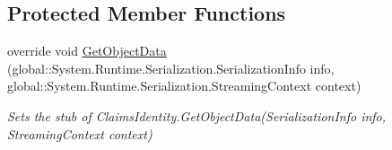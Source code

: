 \subsection*{Protected Member Functions}
\begin{DoxyCompactItemize}
\item 
override void \hyperlink{class_system_1_1_security_1_1_principal_1_1_fakes_1_1_stub_generic_identity_a4d63decef27cbae35b1bbe529596cc87}{Get\-Object\-Data} (global\-::\-System.\-Runtime.\-Serialization.\-Serialization\-Info info, global\-::\-System.\-Runtime.\-Serialization.\-Streaming\-Context context)
\begin{DoxyCompactList}\small\item\em Sets the stub of Claims\-Identity.\-Get\-Object\-Data(\-Serialization\-Info info, Streaming\-Context context)\end{DoxyCompactList}\end{DoxyCompactItemize}
